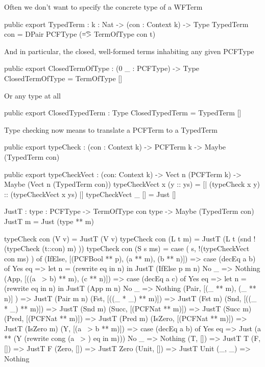 Often we don't want to specify the concrete type of a WFTerm

\begin{code}
public export
TypedTerm : {k : Nat} -> (con : Context k) -> Type
TypedTerm con = DPair PCFType (\t => TermOfType con t)
\end{code}

And in particular, the closed, well-formed terms inhabiting any given PCFType

\begin{code}
public export
ClosedTermOfType : (0 _ : PCFType) -> Type
ClosedTermOfType = TermOfType []
\end{code}

Or any type at all

\begin{code}
public export
ClosedTypedTerm : Type
ClosedTypedTerm = TypedTerm []
\end{code}

Type checking now means to translate a PCFTerm to a TypedTerm

\begin{code}
public export
typeCheck : (con : Context k) -> PCFTerm k -> Maybe (TypedTerm con)
\end{code}


\begin{code}
public export
typeCheckVect : (con: Context k) -> Vect n (PCFTerm k) -> Maybe (Vect n (TypedTerm con))
typeCheckVect x (y :: ys) = [| (typeCheck x y) :: (typeCheckVect x ys) |]
typeCheckVect _ []        = Just []

JustT : {type : PCFType} -> TermOfType con type -> Maybe (TypedTerm con)
JustT m = Just (type ** m)

typeCheck con (V v)    = JustT (V v) 
typeCheck con (L t m)  = JustT (L t (snd !(typeCheck (t::con) m) ))
typeCheck con (S s ms) = case ( s,  !(typeCheckVect con ms) ) of
  (IfElse,  [(PCFBool ** p), (a ** m), (b ** n)]) 
      => case (decEq a b) of
            Yes eq => let n = (rewrite eq in n) in JustT (IfElse p m n)
            No  _  => Nothing
  (App,     [((a ~> b) ** m), (c ** n)])
      => case (decEq a c) of
            Yes eq => let n = (rewrite eq in n) in JustT (App m n)
            No  _  => Nothing
  (Pair,    [(_ ** m), (_ ** n)] )  => JustT (Pair m n)
  (Fst,     [((_ * _) ** m)])       => JustT (Fst m)
  (Snd,     [((_ * _) ** m)])       => JustT (Snd m)
  (Succ,    [(PCFNat ** m)])        => JustT (Succ m)
  (Pred,    [(PCFNat ** m)])        => JustT (Pred m)
  (IsZero,  [(PCFNat ** m)])        => JustT (IsZero m)
  (Y,       [(a ~> b ** m)])        => case (decEq a b) of
                                          Yes eq => Just (a ** (Y (rewrite cong (a ~> ) eq in m)))
                                          No  _  => Nothing
  (T,       [])                     => JustT T
  (F,       [])                     => JustT F
  (Zero,    [])                     => JustT Zero
  (Unit,    [])                     => JustT Unit
  (_, _)                            => Nothing
\end{code}

